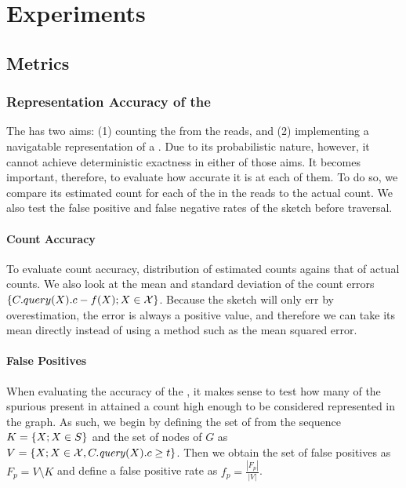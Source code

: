
\section{Experiments}

\subsection{Metrics}


\subsubsection{Representation Accuracy of the \dBCM}

The \dBCM has two aims: (1) counting the  from the reads, and (2) implementing a navigatable representation of a \dBG. Due to its probabilistic nature, however, it cannot achieve deterministic exactness in either of those aims. It becomes important, therefore, to evaluate how accurate it is at each of them. To do so, we compare its estimated count for each of the  in the reads to the  actual count. We also test the false positive and false negative rates of the sketch before traversal.

\paragraph{Count Accuracy} To evaluate count accuracy, distribution of estimated counts agains that of actual counts. We also look at the mean and standard deviation of the count errors $\{C.query(X).c - f(X) ; X \in \readset\}$. Because the \cm sketch will only err by overestimation, the error is always a positive value, and therefore we can take its mean directly instead of using a method such as the mean squared error.

\paragraph{False Positives} When evaluating the accuracy of the \dBCM, it makes sense to test how many of the spurious  present in \readset attained a count high enough to be considered represented in the graph. As such, we begin by defining the set of  from the sequence $K = \{X ; X \in \strname{S}\}$ and the set of nodes of $G$ as $V = \{X ; X \in \readset, C.\mathit{query}(X).c \geq t\}$. Then we obtain the set of false positives as $F_p = V \setminus K$ and define a false positive rate as $f_p = \frac{|F_p|}{|V|}$.

